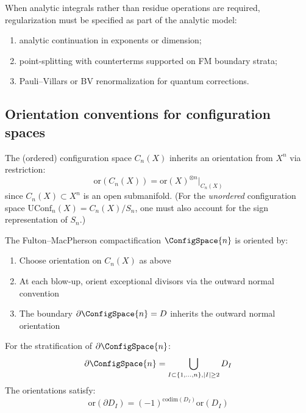 \begin{remark}[Regularization]
When analytic integrals rather than residue operations are required,
regularization must be specified as part of the analytic model:
\begin{enumerate}
\item analytic continuation in exponents or dimension;
\item point-splitting with counterterms supported on FM boundary strata;
\item Pauli--Villars or BV renormalization for quantum corrections.
\end{enumerate}
\end{remark}

\subsection{Orientation conventions for configuration spaces}

\begin{definition}
The (ordered) configuration space $C_n(X)$ inherits an orientation from $X^n$ via restriction:
\[\text{or}(C_n(X)) = \text{or}(X)^{\otimes n}\big|_{C_n(X)}\]
since $C_n(X) \subset X^n$ is an open submanifold. (For the \emph{unordered} configuration space $\mathrm{UConf}_n(X) = C_n(X)/S_n$, one must also account for the sign representation of $S_n$.)
\end{definition}

\begin{definition}
The Fulton--MacPherson compactification $\ConfigSpace{n}$ is oriented by:
\begin{enumerate}
\item Choose orientation on $C_n(X)$ as above
\item At each blow-up, orient exceptional divisors via the outward normal convention
\item The boundary $\partial\ConfigSpace{n} = D$ inherits the outward normal orientation
\end{enumerate}
\end{definition}

\begin{lemma}
\label{lem:orientation-compatibility}
For the stratification of $\partial\ConfigSpace{n}$:
\[\partial\ConfigSpace{n} = \bigcup_{I \subset \{1,\ldots,n\}, |I| \geq 2} D_I\]
The orientations satisfy:
\[\text{or}(\partial D_I) = (-1)^{\text{codim}(D_I)} \text{or}(D_I)\]
\end{lemma}


